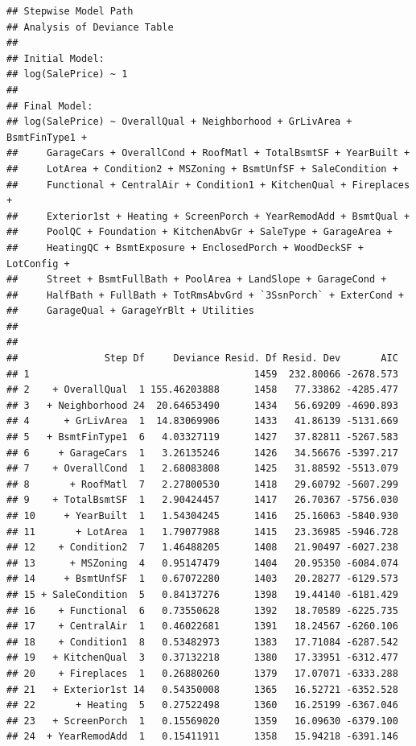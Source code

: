 \documentclass[american,]{article}
\theoremstyle{definition}
\theoremstyle{definition}
\theoremstyle{definition}
\theoremstyle{remark}
\begin{document}
\begin{verbatim}
## Stepwise Model Path 
## Analysis of Deviance Table
## 
## Initial Model:
## log(SalePrice) ~ 1
## 
## Final Model:
## log(SalePrice) ~ OverallQual + Neighborhood + GrLivArea + BsmtFinType1 + 
##     GarageCars + OverallCond + RoofMatl + TotalBsmtSF + YearBuilt + 
##     LotArea + Condition2 + MSZoning + BsmtUnfSF + SaleCondition + 
##     Functional + CentralAir + Condition1 + KitchenQual + Fireplaces + 
##     Exterior1st + Heating + ScreenPorch + YearRemodAdd + BsmtQual + 
##     PoolQC + Foundation + KitchenAbvGr + SaleType + GarageArea + 
##     HeatingQC + BsmtExposure + EnclosedPorch + WoodDeckSF + LotConfig + 
##     Street + BsmtFullBath + PoolArea + LandSlope + GarageCond + 
##     HalfBath + FullBath + TotRmsAbvGrd + `3SsnPorch` + ExterCond + 
##     GarageQual + GarageYrBlt + Utilities
## 
## 
##               Step Df     Deviance Resid. Df Resid. Dev       AIC
## 1                                       1459  232.80066 -2678.573
## 2    + OverallQual  1 155.46203888      1458   77.33862 -4285.477
## 3   + Neighborhood 24  20.64653490      1434   56.69209 -4690.893
## 4      + GrLivArea  1  14.83069906      1433   41.86139 -5131.669
## 5   + BsmtFinType1  6   4.03327119      1427   37.82811 -5267.583
## 6     + GarageCars  1   3.26135246      1426   34.56676 -5397.217
## 7    + OverallCond  1   2.68083808      1425   31.88592 -5513.079
## 8       + RoofMatl  7   2.27800530      1418   29.60792 -5607.299
## 9    + TotalBsmtSF  1   2.90424457      1417   26.70367 -5756.030
## 10     + YearBuilt  1   1.54304245      1416   25.16063 -5840.930
## 11       + LotArea  1   1.79077988      1415   23.36985 -5946.728
## 12    + Condition2  7   1.46488205      1408   21.90497 -6027.238
## 13      + MSZoning  4   0.95147479      1404   20.95350 -6084.074
## 14     + BsmtUnfSF  1   0.67072280      1403   20.28277 -6129.573
## 15 + SaleCondition  5   0.84137276      1398   19.44140 -6181.429
## 16    + Functional  6   0.73550628      1392   18.70589 -6225.735
## 17    + CentralAir  1   0.46022681      1391   18.24567 -6260.106
## 18    + Condition1  8   0.53482973      1383   17.71084 -6287.542
## 19   + KitchenQual  3   0.37132218      1380   17.33951 -6312.477
## 20    + Fireplaces  1   0.26880260      1379   17.07071 -6333.288
## 21   + Exterior1st 14   0.54350008      1365   16.52721 -6352.528
## 22       + Heating  5   0.27522498      1360   16.25199 -6367.046
## 23   + ScreenPorch  1   0.15569020      1359   16.09630 -6379.100
## 24  + YearRemodAdd  1   0.15411911      1358   15.94218 -6391.146

\end{verbatim}
\end{document}
